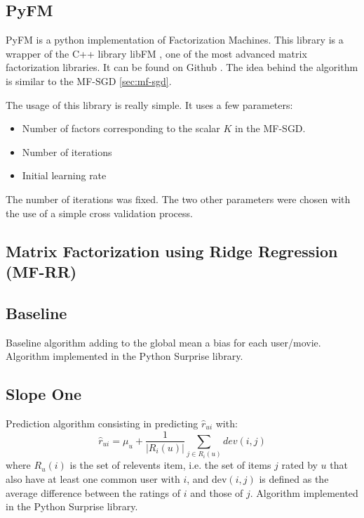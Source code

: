 \documentclass[10pt,conference,compsocconf]{IEEEtran}
\begin{document}
\subsection{PyFM}


PyFM is a python implementation of Factorization Machines. This library is a wrapper of the C++ library libFM \cite{rendle:tist2012}, one of the most advanced matrix factorization libraries. It can be found on Github \cite{pyfm}. The idea behind the algorithm is similar to the MF-SGD \ref{sec:mf-sgd}. 

The usage of this library is really simple. It uses a few parameters:
\begin{itemize}
 \item Number of factors corresponding to the scalar $K$ in the MF-SGD.
 \item Number of iterations
 \item Initial learning rate
\end{itemize}

The number of iterations was fixed. The two other parameters were chosen with the use of a simple cross validation process.

\subsection{Matrix Factorization using Ridge Regression (MF-RR)}

\subsection{Baseline}
Baseline algorithm adding to the global mean a bias for each user/movie. Algorithm implemented in the
Python Surprise library. \cite{library:surprise}


\subsection{Slope One}
Prediction algorithm consisting in predicting $\hat r_{ui}$ with:
$$ \hat r_{ui}=\mu_u + \frac{1}{|R_i(u)|}\sum_{j\in R_i(u)} dev(i,j)$$
where $R_u(i)$ is the set of relevents item, i.e. the set of items $j$ rated by $u$ that also have
at least one common user with $i$, and $\text{dev}(i,j)$ is defined as the average difference
between the ratings of $i$ and those of $j$. Algorithm implemented in the Python Surprise library.
\cite{library:surprise}
\end{document}
